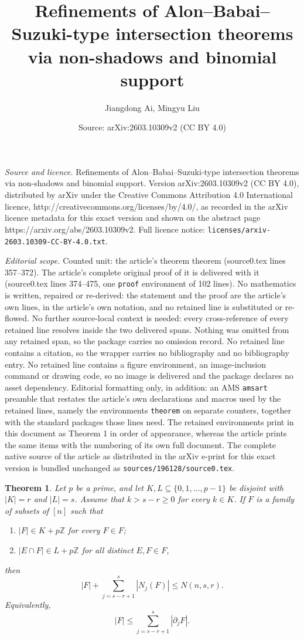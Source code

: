 \documentclass[10pt,a4paper]{amsart}
\title{Refinements of Alon–Babai–Suzuki-type intersection theorems via non-shadows and binomial support}
\author{Jiangdong Ai, Mingyu Liu}
\date{Source: arXiv:2603.10309v2 (CC BY 4.0)}
\newtheorem{theorem}{Theorem}
\begin{document}
\maketitle

\noindent\emph{Source and licence.} Refinements of Alon–Babai–Suzuki-type intersection theorems via non-shadows and binomial support. Version arXiv:2603.10309v2 (CC BY 4.0), distributed by arXiv under the Creative Commons Attribution 4.0 International licence, http://creativecommons.org/licenses/by/4.0/, as recorded in the arXiv licence metadata for this exact version and shown on the abstract page https://arxiv.org/abs/2603.10309v2. Full licence notice: \texttt{licenses/arxiv-2603.10309-CC-BY-4.0.txt}.\par\smallskip

\noindent\textit{Editorial scope.} Counted unit: the article's theorem theorem (source0.tex lines 357--372). The article's complete original proof of it is delivered with it (source0.tex lines 374--475, one \texttt{proof} environment of 102 lines). No mathematics is written, repaired or re-derived: the statement and the proof are the article's own lines, in the article's own notation, and no retained line is substituted or re-flowed.  No further source-local context is needed: every cross-reference of every retained line resolves inside the two delivered spans.  Nothing was omitted from any retained span, so the package carries no omission record.  No retained line contains a citation, so the wrapper carries no bibliography and no bibliography entry.  No retained line contains a figure environment, an image-inclusion command or drawing code, so no image is delivered and the package declares no asset dependency.  Editorial formatting only, in addition: an AMS \texttt{amsart} preamble that restates the article's own declarations and macros used by the retained lines, namely the environments \texttt{theorem} on separate counters, together with the standard packages those lines need.  The retained environments print in this document as Theorem 1 in order of appearance, whereas the article prints the same items with the numbering of its own full document.  The complete native source of the article as distributed in the arXiv e-print for this exact version is bundled unchanged as \texttt{sources/196128/source0.tex}.
\begin{theorem}
Let $p$ be a prime, and let $K,L \subseteq \{0,1,\ldots,p-1\}$ be disjoint with $|K|=r$ and
$|L|=s$. Assume that $k>s-r\geq 0$ for every $k\in K$. If $F$ is a family of subsets of $[n]$ such that
\begin{enumerate}
\item[(i)] $|F| \in K+p\mathbb Z$ for every $F\in F$;
\item[(ii)] $|E\cap F| \in L+p\mathbb Z$ for all distinct $E,F\in F$,
\end{enumerate}
then
$$
|F|+\sum_{j=s-r+1}^{s}|N_j(F)| \le N(n,s,r).
$$
Equivalently,
$$
|F| \le \sum_{j=s-r+1}^{s} |\partial_j F|.
$$
\end{theorem}
\end{document}
